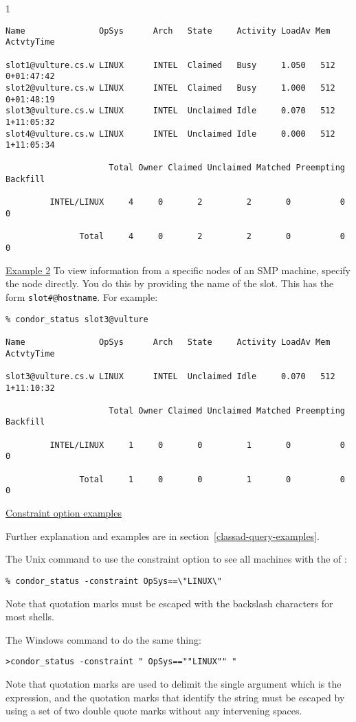 \begin{ManPage}{\label{man-condor-status}}{1}
\begin{verbatim}
Name               OpSys      Arch   State     Activity LoadAv Mem   ActvtyTime

slot1@vulture.cs.w LINUX      INTEL  Claimed   Busy     1.050   512  0+01:47:42
slot2@vulture.cs.w LINUX      INTEL  Claimed   Busy     1.000   512  0+01:48:19
slot3@vulture.cs.w LINUX      INTEL  Unclaimed Idle     0.070   512  1+11:05:32
slot4@vulture.cs.w LINUX      INTEL  Unclaimed Idle     0.000   512  1+11:05:34

                     Total Owner Claimed Unclaimed Matched Preempting Backfill

         INTEL/LINUX     4     0       2         2       0          0        0

               Total     4     0       2         2       0          0        0
\end{verbatim}
\normalsize


\underline{Example 2} To view information from a specific nodes of an
SMP machine, specify the node directly.
You do this by providing the name of the slot.
This has the form \texttt{slot\#@hostname}.
For example:
\footnotesize
\begin{verbatim}
% condor_status slot3@vulture

Name               OpSys      Arch   State     Activity LoadAv Mem   ActvtyTime

slot3@vulture.cs.w LINUX      INTEL  Unclaimed Idle     0.070   512  1+11:10:32

                     Total Owner Claimed Unclaimed Matched Preempting Backfill

         INTEL/LINUX     1     0       0         1       0          0        0

               Total     1     0       0         1       0          0        0
\end{verbatim}
\normalsize

\underline{Constraint option examples}

Further explanation and examples are in section~\ref{classad-query-examples}.

The Unix command
to use the constraint option to see all machines with the 
of :
\begin{verbatim}
% condor_status -constraint OpSys==\"LINUX\"
\end{verbatim}
Note that quotation marks must be escaped with the backslash characters
for most shells.

The Windows command to do the same thing:
\begin{verbatim}
>condor_status -constraint " OpSys==""LINUX"" "
\end{verbatim}
Note that quotation marks are used to delimit the single argument which
is the expression, and the quotation marks that identify the string
must be escaped by using a set of two double quote marks without
any intervening spaces.


\end{ManPage}
